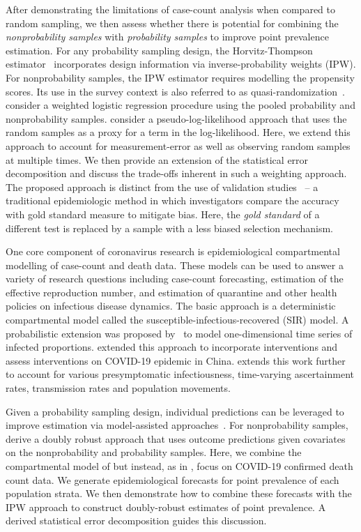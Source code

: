 \documentclass[11pt]{amsart}
\numberwithin{equation}{section}
\theoremstyle{plain}
\begin{document}
After demonstrating the limitations of case-count analysis when compared to random sampling, we then assess whether there is potential for combining the \emph{nonprobability samples} with \emph{probability samples} to improve point prevalence estimation. For any probability sampling design, the Horvitz-Thompson estimator~\citep{HT1952} incorporates design information via inverse-probability weights (IPW).  For nonprobability samples, the IPW estimator requires modelling the propensity scores.  Its use in the survey context is also referred to as quasi-randomization~\citep{Elliott2017}. \cite{Valliant2011} consider a weighted logistic regression procedure using the pooled probability and nonprobability samples.  \cite{Chen2019} consider a pseudo-log-likelihood approach that uses the random samples as a proxy for a term in the log-likelihood.  Here, we extend this approach to account for measurement-error as well as observing random samples at multiple times. We then provide an extension of the statistical error decomposition and discuss the trade-offs inherent in such a weighting approach. The proposed approach is distinct from the use of validation studies~\citep{Fox2020} -- a traditional epidemiologic method in which investigators compare the accuracy with gold standard measure to mitigate bias.  Here, the \emph{gold standard} of a different test is replaced by a sample with a less biased selection mechanism.

One core component of coronavirus research is epidemiological compartmental modelling of case-count and death data. These models can be used to answer a variety of research questions including case-count forecasting, estimation of the effective reproduction number, and estimation of quarantine and other health policies on infectious disease dynamics.  The basic approach is a deterministic compartmental model called the susceptible-infectious-recovered (SIR) model.  A probabilistic extension was proposed by~\cite{Osthus2017} to model one-dimensional time series of infected proportions. \cite{Song2020} extended this approach to incorporate interventions and assess interventions on COVID-19 epidemic in China. \cite{Hao2020} extends this work further to account for various presymptomatic infectiousness, time-varying ascertainment rates, transmission rates and population movements.

Given a probability sampling design, individual predictions can be leveraged to improve estimation via model-assisted approaches~\citep{Breidt2017}.  For nonprobability samples, \cite{Chen2019} derive a doubly robust approach that uses outcome predictions given covariates on the nonprobability and probability samples.  Here, we combine the compartmental model of \cite{Song2020} but instead, as in \cite{Johndrow2020}, focus on COVID-19 confirmed death count data.  We generate epidemiological forecasts for point prevalence of each population strata.  We then demonstrate how to combine these forecasts with the IPW approach to construct doubly-robust estimates of point prevalence.  A derived statistical error decomposition guides this discussion.
\end{document}

